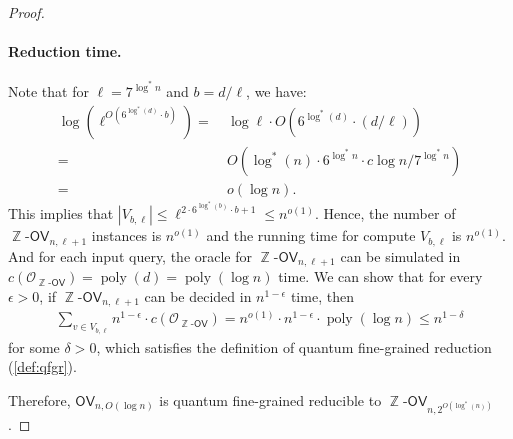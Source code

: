 \documentclass[10pt,a4paper]{article}
\DeclareMathOperator*{\Z}{\mathbb{Z}}
\DeclareMathOperator{\poly}{poly}
\newcommand{\ora}{\mathcal{O}}
\newcommand{\OV}{\ensuremath{\mathsf{OV}}}
\newcommand{\ZOV}{\ensuremath{\Z\text{-}\mathsf{OV}}}
\begin{document}
\begin{proof}
\paragraph*{Reduction time.} Note that for $\ell=7^{\log^* n}$ and $b=d/\ell$, we have:
\begin{align}
    \log\left( \ell^{O(6^{\log^* (d)}\cdot b)} \right) = &~ \log \ell \cdot O\left( 6^{\log^* (d)}\cdot (d/\ell) \right)\\
    =&~ O\left( \log^* (n)\cdot 6^{\log^* n} \cdot c\log n / 7^{\log^* n} \right)\\
    =&~ o(\log n).
\end{align}
This implies that $|V_{b,\ell}|\leq \ell^{2\cdot 6^{\log^* (b)}\cdot b+1} \leq n^{o(1)}$.
Hence, the number of $\ZOV_{n,\ell+1}$ instances is $n^{o(1)}$ and the running time for compute $V_{b,\ell}$ is $n^{o(1)}$. And for each input query, the oracle for $\ZOV_{n,\ell+1}$ can be simulated in $c(\ora_{\ZOV})=\poly(d)=\poly(\log n)$ time. We can show that for every $\epsilon>0$, if $\ZOV_{n,\ell+1}$ can be decided in $n^{1-\epsilon}$ time, then
\begin{align}
    \sum_{v\in V_{b,\ell}} n^{1-\epsilon}\cdot c(\ora_{\ZOV})=n^{o(1)}\cdot n^{1-\epsilon}\cdot \poly(\log n) \leq n^{1-\delta}
\end{align}
for some $\delta > 0$, which satisfies the definition of quantum fine-grained reduction (\cref{def:qfgr}).

Therefore, $\OV_{n,O(\log n)}$ is quantum fine-grained reducible to $\ZOV_{n,2^{O(\log^* (n))}}$.
\end{proof}
\end{document}
